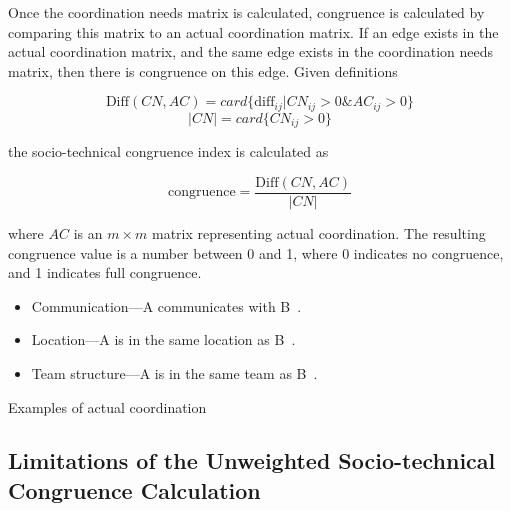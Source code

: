 Once the coordination needs matrix is calculated, congruence is calculated by comparing this matrix to an actual coordination matrix. If an edge exists in the actual coordination matrix, and the same edge exists in the coordination needs matrix, then there is congruence on this edge. Given definitions


\[ \text{Diff}(CN, AC) = card\{ \text{diff}_{ij} | CN_{ij} > 0 \& AC_{ij} > 0 \} \]
\[|CN| = card \{ CN_{ij} > 0 \} \]

\noindent the socio-technical congruence index is calculated as~\cite{cataldo:esem:2008}

\[ \text{congruence} = \frac{\text{Diff}(CN, AC)}  {|CN|} \]

\noindent where $AC$ is an $m \times m$ matrix representing actual coordination. The resulting congruence value is a number between 0 and 1, where 0 indicates no congruence, and 1 indicates full congruence.


\begin{placeholder}[t]
\begin{itemize}
\item Communication---A communicates with B~\cite{cataldo:cscw:2006, ehrlich2008:gaps, cataldo:esem:2008,damian2007:collaboration}.
\item Location---A is in the same location as B~\cite{cataldo:cscw:2006, ehrlich2008:gaps}.
\item Team structure---A is in the same team as B~\cite{cataldo:cscw:2006}.
\end{itemize}
\caption{Examples of actual coordination}
\label{ph:relationships}
\end{placeholder}

\subsection{Limitations of the Unweighted Socio-technical Congruence Calculation}
 
